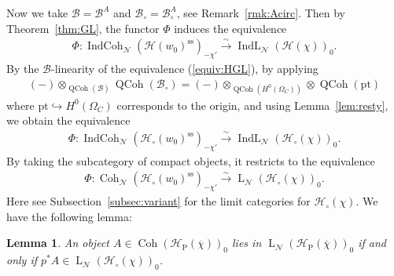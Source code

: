 \documentclass[11pt,oneside,a4paper,mathscr]{amsart}
\newtheorem{lemma}[thm]{Lemma}
\theoremstyle{definition}
\newcommand{\LL}{\operatorname{L}}
\newcommand{\QCoh}{\operatorname{QCoh}}
\newcommand{\cH}{\mathcal{H}}
\newcommand{\cB}{\mathcal{B}}
\newcommand{\Coh}{\operatorname{Coh}}
\newcommand{\IndCoh}{\operatorname{IndCoh}}
\newcommand{\IndL}{\operatorname{IndL}}
\begin{document}
Now we take $\cB=\cB^A$ and $\cB_{\circ}=\cB_{\circ}^A$, see Remark~\ref{rmk:Acirc}. Then by Theorem~\ref{thm:GL}, the functor $\Phi$ 
induces the equivalence 
\begin{align}\label{equiv:HGL}
    \Phi \colon \IndCoh_{\mathcal{N}}(\cH(w_0)^{\mathrm{ss}})_{-\chi'} \stackrel{\sim}{\to}
    \IndL_{\mathcal{N}}(\cH(\chi))_{0}.
\end{align}
By the $\cB$-linearity of the equivalence (\ref{equiv:HGL}), 
by applying 
\begin{align*}
    (-)\otimes_{\QCoh(\cB)}\QCoh(\cB_{\circ})=(-)\otimes_{\QCoh(H^0(\Omega_C))}\otimes \QCoh(\mathrm{pt})
\end{align*}
where $\mathrm{pt} \hookrightarrow H^0(\Omega_C)$ corresponds to the origin, 
and using Lemma~\ref{lem:resty}, we obtain the equivalence 
\begin{align*}
    \Phi \colon \IndCoh_{\mathcal{N}}(\cH_{\circ}(w_0)^{\mathrm{ss}})_{-\chi'} \stackrel{\sim}{\to}
    \IndL_{\mathcal{N}}(\cH_{\circ}(\chi))_{0}.
\end{align*}
By taking the subcategory of compact objects, it restricts
to the equivalence 
\begin{align}\label{PhiL}
      \Phi \colon \Coh_{\mathcal{N}}(\cH_{\circ}(w_0)^{\mathrm{ss}})_{-\chi'} \stackrel{\sim}{\to}
    \LL_{\mathcal{N}}(\cH_{\circ}(\chi))_{0}.
\end{align}
Here see Subsection~\ref{subsec:variant} for the limit categories for $\cH_{\circ}(\chi)$. We have the following lemma: 
\begin{lemma}\label{lem:pL}
An object $A \in \Coh(\cH_{\mathrm{P}}(\overline{\chi}))_0$ lies in $\LL_{\mathcal{N}}(\cH_{\mathrm{P}}(\overline{\chi}))_0$
if and only if $p^* A \in \LL_{\mathcal{N}}(\cH_{\circ}(\chi))_0$.
\end{lemma}
\end{document}
